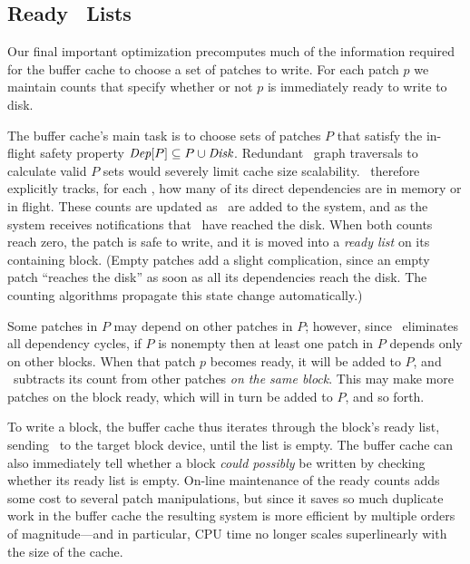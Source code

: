 
\subsection{Ready \ChDesc\ Lists}
\label{sec:patch:readylist}

\newcommand{\PReady}[1]{\ensuremath{#1.\textit{ready}}}

Our final important optimization precomputes much of the information
required for the buffer cache to choose a set of patches to write.
%
For each patch $p$ we maintain counts that specify whether or not $p$ is
immediately ready to write to disk.


The buffer cache's main task is to choose sets of patches $P$ that satisfy
the in-flight safety property $\PDepset{P} \subseteq P \cup \PDisk$.
%
Redundant \chdesc\ graph traversals to calculate valid $P$ sets would
severely limit cache size scalability.
%
\Kudos\ therefore explicitly tracks, for each \chdesc, how many of its
direct dependencies are in memory or in flight.
%
These counts are updated as \patches\ are added to the system, and as the
system receives notifications that \patches\ have reached the disk.
%
When both counts reach zero, the patch is safe to write, and it is moved
into a \emph{ready list} on its containing block.
%
(Empty patches add a slight complication, since an empty patch ``reaches
the disk'' as soon as all its dependencies reach the disk.  The counting
algorithms propagate this state change automatically.)


Some patches in $P$ may depend on other patches in $P$; however, since
\Kudos\ eliminates all dependency cycles, if $P$ is nonempty then at least
one patch in $P$ depends only on other blocks.
%
When that patch $p$ becomes ready, it will be added to $P$, and \Kudos\
subtracts its count from other patches \emph{on the same block}.
%
This may make more patches on the block ready, which will in turn be added
to $P$, and so forth.


To write a block, the buffer cache thus iterates through the block's ready
list, sending \chdescs\ to the target block device, until the list is
empty. 
%
The buffer cache can also immediately tell whether a block \emph{could
possibly} be written by checking whether its ready list is empty.
%
On-line maintenance of the ready counts adds some cost to several patch
manipulations, but since it saves so much duplicate work in the buffer
cache the resulting system is more efficient by multiple orders of
magnitude---and in particular, CPU time no longer scales superlinearly with
the size of the cache.


